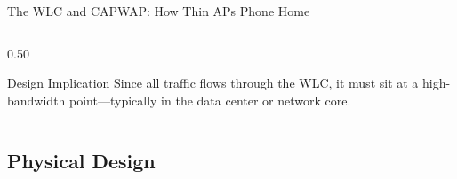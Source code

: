\documentclass[aspectratio=169]{beamer}
\begin{document}
\begin{frame}{The WLC and CAPWAP: How Thin APs Phone Home}
\begin{columns}[T]
\begin{column}{0.50\textwidth}
\begin{center}
            \end{center}
            \vspace{0.3em}
            \begin{block}{Design Implication}
                \footnotesize
                Since all traffic flows through the WLC, it must sit at a high-bandwidth point---typically in the data center or network core.
            \end{block}
        \end{column}
    \end{columns}
\end{frame}

\subsection{Physical Design}
\end{document}
